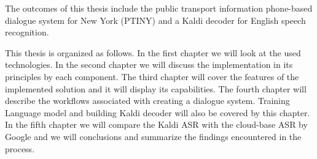 The outcomes of this thesis include the public transport information phone-based dialogue system for New York (\ac{PTINY}) and a Kaldi decoder for English speech recognition.

This thesis is organized as follows.
In the first chapter we will look at the used technologies.
In the second chapter we will discuss the implementation in its principles by each component. %
The third chapter will cover the features of the implemented solution and it will display its capabilities.
The fourth chapter will describe the workflows associated with creating a dialogue system.
Training Language model and building Kaldi decoder will also be covered by this chapter.
In the fifth chapter we will compare the Kaldi \ac{ASR} with the cloud-base \ac{ASR} by Google and we will conclusions and summarize the findings encountered in the process.
















